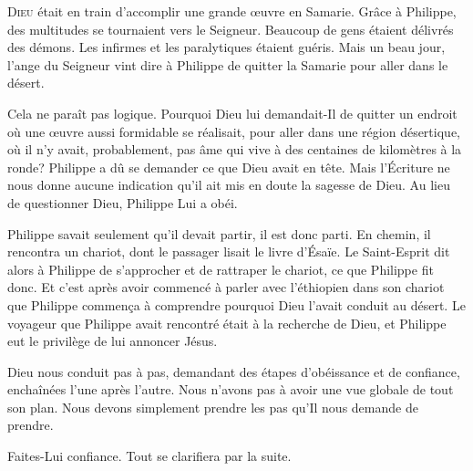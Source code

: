 


\lettrine{D}{ieu} était en train d'accomplir une grande \oe{}uvre en Samarie.
 Grâce à Philippe, des multitudes se tournaient vers le Seigneur.
 Beaucoup de gens étaient délivrés des démons.
 Les infirmes et les paralytiques étaient guéris. Mais un beau jour,
 l'ange du Seigneur vint dire à Philippe de quitter la Samarie
 pour aller dans le désert.

Cela ne paraît pas logique. Pourquoi Dieu lui demandait-Il de quitter
 un endroit où une \oe{}uvre aussi formidable se réalisait,
 pour aller dans une région désertique, où il n'y avait, probablement,
 pas âme qui vive à des centaines de kilomètres à la ronde?
 Philippe a dû se demander ce que Dieu avait en tête.
 Mais l'Écriture ne nous donne aucune indication
 qu'il ait mis en doute la sagesse de Dieu.
 Au lieu de questionner Dieu, Philippe Lui a obéi.


Philippe savait seulement qu'il devait partir, il est donc parti.
 En chemin, il rencontra un chariot, dont le passager lisait le livre d'Ésaïe.
 Le Saint-Esprit dit alors à Philippe de s'approcher et de rattraper le chariot,
 ce que Philippe fit donc. Et c'est après avoir commencé à parler
 avec l'éthiopien dans son chariot que Philippe commen\c{c}a à comprendre
 pourquoi Dieu l'avait conduit au désert.
 Le voyageur que Philippe avait rencontré était à la recherche de Dieu,
 et Philippe eut le privilège de lui annoncer Jésus.

Dieu nous conduit pas à pas, demandant des étapes d'obéissance et de confiance,
 enchaînées l'une après l'autre. Nous n'avons pas à avoir une vue globale
 de tout son plan. Nous devons simplement prendre les pas
 qu'Il nous demande de prendre.

Faites-Lui confiance. Tout se clarifiera par la suite.

\dvrule



